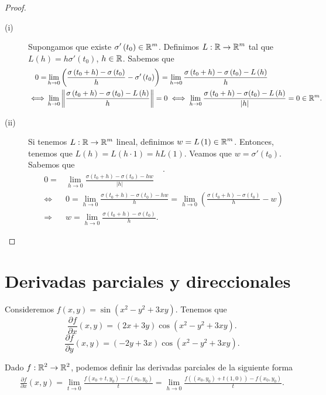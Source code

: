 \begin{proof}
\begin{description}
\item[(i)] Supongamos que existe $\displaystyle \sigma'\left(t_{0}\right) \in \mathbb{R}^{m} $. Definimos $\displaystyle L : \mathbb{R} \to \mathbb{R}^{m} $ tal que $\displaystyle L\left(h\right) = h\sigma'\left(t_{0}\right) $, $\displaystyle h \in \mathbb{R} $. Sabemos que
	\[
	\begin{split}
		0 = & \lim_{h \to 0}\left(\frac{\sigma \left(t_{0}+h\right)-\sigma\left(t_{0}\right)}{h}-\sigma'\left(t_{0}\right)\right) = \lim_{h \to 0}\frac{\sigma\left(t_{0}+h\right)-\sigma\left(t_{0}\right)-L\left(h\right)}{h} \\
	\iff & \lim_{h \to 0}\left\|\frac{\sigma\left(t_{0}+h\right)-\sigma\left(t_{0}\right)-L\left(h\right)}{h}\right\| = 0 \iff \lim_{h \to 0} \frac{\sigma\left(t_{0}+h\right)-\sigma(t_{0}) - L\left(h\right)}{ \left|h\right|} = 0 \in \mathbb{R}^{m}.
	\end{split}
	\]
\item[(ii)] Si tenemos $\displaystyle L : \mathbb{R} \to \mathbb{R}^{m} $ lineal, definimos $\displaystyle w = L\left(1\right) \in \mathbb{R}^{m} $. Entonces, tenemos que $\displaystyle L\left(h\right) = L\left(h \cdot 1\right) = hL\left(1\right) $. Veamos que $\displaystyle w = \sigma'\left(t_{0}\right) $. Sabemos que
	\[  .\]
	\[
	\begin{split}
		0 = & \lim_{h \to 0}\frac{\sigma\left(t_{0}+h\right)-\sigma\left(t_{0}\right)-hw}{ \left|h\right|} \\
	\iff & 0 = \lim_{h \to 0}\frac{\sigma\left(t_{0}+h\right)-\sigma\left(t_{0}\right)-hw}{h} =\lim_{h \to 0}\left(\frac{\sigma\left(t_{0}+h\right)-\sigma\left(t_{0}\right)}{h}-w\right) \\
	\Rightarrow & w = \lim_{h \to 0}\frac{\sigma\left(t_{0}+h\right)-\sigma\left(t_{0}\right)}{h} .
	\end{split}
	\]
\end{description}
\end{proof}
\section{Derivadas parciales y direccionales}
\begin{eg}
Consideremos $\displaystyle f\left(x,y\right) = \sin\left(x^{2}-y^{2}+3xy\right) $. Tenemos que
\[\frac{\partial f}{\partial x}\left(x,y\right) = \left(2x+3y\right)\cos\left(x^{2}-y^{2}+3xy\right) .\]
\[\frac{\partial f}{\partial y}\left(x,y\right) = \left(-2y + 3x\right)\cos\left(x^{2}-y^{2}+3xy\right) .\]
\end{eg}
Dado $\displaystyle f : \mathbb{R}^{2} \to \mathbb{R}^{2} $, podemos definir las derivadas parciales de la siguiente forma
\[
\begin{split}
\frac{\partial f}{\partial x}\left(x,y\right) = \lim_{t \to 0}\frac{f\left(x_{0}+ t, y_{0}\right)-f\left(x_{0}, y_{0}\right)}{t} = \lim_{h \to 0}\frac{f\left(\left(x_{0},y_{0}\right)+t\left(1,0\right)\right)-f\left(x_{0}, y_{0}\right)}{t} .
\end{split}
\]

